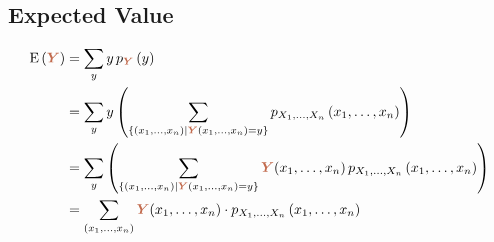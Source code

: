 \documentclass{article}
\DeclareRobustCommand{\myRandV}[1]{#1} %
\newcommand{\myPMF}[2]{p_{#1}\left(#2\right)}
\newcommand{\myExpect}[1]{\operatorname{E}\left(#1\right)} %
\newcommand{\myParam}[1]{\textcolor{myParamColor}{\bm{#1}}}
\begin{document}
\subsection{Expected Value}

\begin{equation*}
\begin{aligned}
    \myExpect{\myParam{\myRandV{Y}}} &= \sum_{y} y \, \myPMF{\myParam{\myRandV{Y}}}{y} \\
    &= \sum_{y} y \left(\sum_{\{ (x_1, \dots, x_n) \mid \myParam{\myRandV{Y}}(x_1, \dots, x_n) = y\}} \myPMF{\myRandV{X_1}, \dots, \myRandV{X_n}}{x_1, \dots, x_n}\right) \\
    &= \sum_{y} \left(\sum_{\{ (x_1, \dots, x_n) \mid \myParam{\myRandV{Y}}(x_1, \dots, x_n) = y\}} \myParam{\myRandV{Y}}(x_1, \dots, x_n) \, \myPMF{\myRandV{X_1}, \dots, \myRandV{X_n}}{x_1, \dots, x_n}\right) \\
    &= \sum_{(x_1, \dots, x_n)} \myParam{\myRandV{Y}}(x_1, \dots, x_n) \cdot \myPMF{\myRandV{X_1}, \dots, \myRandV{X_n}}{x_1, \dots, x_n}
\end{aligned}
\end{equation*}
\end{document}
